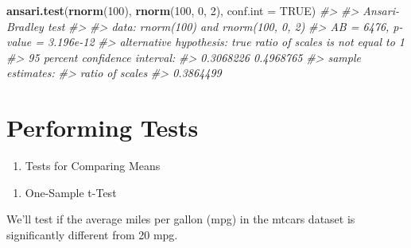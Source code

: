 \documentclass[
]{book}
\newenvironment{Shaded}{\begin{snugshade}}{\end{snugshade}}
\newcommand{\AttributeTok}[1]{\textcolor[rgb]{0.13,0.29,0.53}{#1}}
\newcommand{\CommentTok}[1]{\textcolor[rgb]{0.56,0.35,0.01}{\textit{#1}}}
\newcommand{\ConstantTok}[1]{\textcolor[rgb]{0.56,0.35,0.01}{#1}}
\newcommand{\DecValTok}[1]{\textcolor[rgb]{0.00,0.00,0.81}{#1}}
\newcommand{\FunctionTok}[1]{\textcolor[rgb]{0.13,0.29,0.53}{\textbf{#1}}}
\newcommand{\NormalTok}[1]{#1}
\newcommand{\SpecialCharTok}[1]{\textcolor[rgb]{0.81,0.36,0.00}{\textbf{#1}}}
\providecommand{\tightlist}{%
  \setlength{\itemsep}{0pt}\setlength{\parskip}{0pt}}
\begin{document}
\begin{Shaded}
\begin{Highlighting}[]
\FunctionTok{ansari.test}\NormalTok{(}\FunctionTok{rnorm}\NormalTok{(}\DecValTok{100}\NormalTok{), }\FunctionTok{rnorm}\NormalTok{(}\DecValTok{100}\NormalTok{, }\DecValTok{0}\NormalTok{, }\DecValTok{2}\NormalTok{), }\AttributeTok{conf.int =} \ConstantTok{TRUE}\NormalTok{)}
\CommentTok{\#\textgreater{} }
\CommentTok{\#\textgreater{}  Ansari{-}Bradley test}
\CommentTok{\#\textgreater{} }
\CommentTok{\#\textgreater{} data:  rnorm(100) and rnorm(100, 0, 2)}
\CommentTok{\#\textgreater{} AB = 6476, p{-}value = 3.196e{-}12}
\CommentTok{\#\textgreater{} alternative hypothesis: true ratio of scales is not equal to 1}
\CommentTok{\#\textgreater{} 95 percent confidence interval:}
\CommentTok{\#\textgreater{}  0.3068226 0.4968765}
\CommentTok{\#\textgreater{} sample estimates:}
\CommentTok{\#\textgreater{} ratio of scales }
\CommentTok{\#\textgreater{}       0.3864499}
\end{Highlighting}
\end{Shaded}

\section*{Performing Tests}\label{performing-tests}

\begin{enumerate}
\def\labelenumi{\arabic{enumi}.}
\tightlist
\item
  Tests for Comparing Means
\end{enumerate}

\begin{enumerate}
\def\labelenumi{\alph{enumi}.}
\tightlist
\item
  One-Sample t-Test
\end{enumerate}

We'll test if the average miles per gallon (mpg) in the mtcars dataset is significantly different from 20 mpg.

\begin{Shaded}
\end{Shaded}
\end{document}

